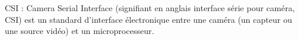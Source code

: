 \begin{definition}
    \newcommand{\lab}[1]{(\ref{#1})}
    CSI : Camera Serial Interface (signifiant en anglais interface série pour caméra, CSI) est un standard d'interface électronique entre une caméra (un capteur ou une source vidéo) et un microprocesseur.
    \label{def:csi}
\end{definition}


